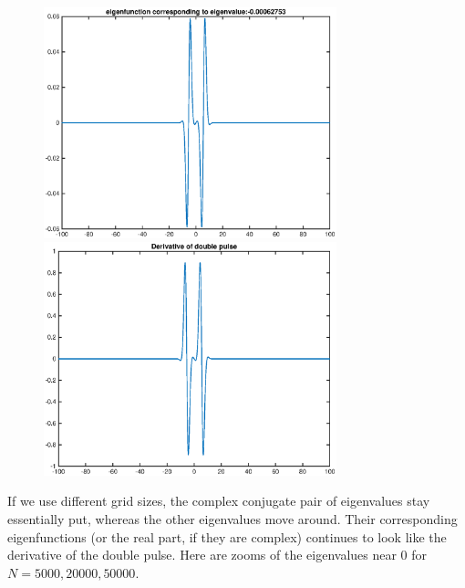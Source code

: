 \documentclass[12pt]{article}
\begin{document}
\begin{figure}[H]
\includegraphics[width=8.5cm]{eig1fn3.eps}
\includegraphics[width=8.5cm]{d1deriv.eps}
\end{figure}

If we use different grid sizes, the complex conjugate pair of eigenvalues stay essentially put, whereas the other eigenvalues move around. Their corresponding eigenfunctions (or the real part, if they are complex) continues to look like the derivative of the double pulse. Here are zooms of the eigenvalues near 0 for $N = 5000, 20000, 50000$.
\end{document}
